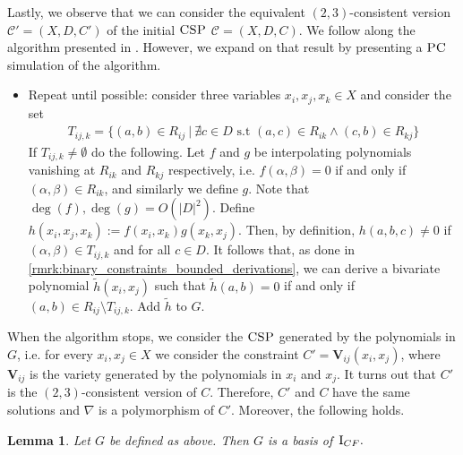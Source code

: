 \documentclass[11pt]{article}
\newcommand{\Cc}{\mathcal{C}}
\newcommand{\CSP}{\textsc{CSP}}
\newcommand{\PC}{\textsc{PC}}
\newcommand{\Variety}[1]{{\textbf{V}}\left( #1 \right)}
\newcommand{\I}{\emph{$\rm{I}$}}
\newcommand{\1}{\textbf{1}}
\newcommand{\GB}{\text{Gr\"{o}bner} }
\newtheorem{lemma}[theorem]{Lemma}
\begin{document}
Lastly, we observe that we can consider the equivalent $(2,3)$-consistent version $\Cc' = (X, D, C')$ of the initial $\CSP$ $\Cc = (X, D, C)$. We follow along the algorithm presented in \cite{BulatovRSTOC22}. However, we expand on that result by presenting a $\PC$ simulation of the algorithm.
\begin{itemize}
    \item Repeat until possible: consider three variables $x_i, x_j, x_k \in X$ and consider the set
    \begin{align*}
        T_{ij,k} = \{(a,b) \in R_{ij} \ | \ \nexists c \in D \text{ s.t } (a,c) \in R_{ik} \wedge (c,b) \in R_{kj} \} 
    \end{align*}
    If $T_{ij,k} \neq \emptyset$ do the following. Let $f$ and $g$ be interpolating polynomials vanishing at $R_{ik}$ and $R_{kj}$ respectively, i.e. $f(\alpha, \beta) = 0$ if and only if $(\alpha, \beta) \in R_{ik}$, and similarly we define $g$. Note that $\deg(f), \deg(g) = O(|D|^2)$. Define $h(x_i, x_j, x_k) := f(x_i, x_k)g(x_k, x_j)$. Then, by definition, $h(a,b,c) \neq 0$ if $(\alpha,\beta) \in T_{ij,k}$ and for all $c \in D$. It follows that, as done in \cref{rmrk:binary_constraints_bounded_derivations}, we can derive a bivariate polynomial $\tilde{h}(x_i,x_j)$ such that $\tilde{h}(a,b) = 0$ if and only if $(a,b) \in R_{ij} \setminus T_{ij,k}$. Add $\tilde{h}$ to $G$.
\end{itemize}
When the algorithm stops, we consider the $\CSP$ generated by the polynomials in $G$, i.e. for every $x_i, x_j \in X$ we consider the constraint $C' = \mathbf{V}_{ij}(x_i, x_j)$, where $\mathbf{V}_{ij}$ is the variety generated by the polynomials in $x_i$ and $x_j$. It turns out that $C'$ is the $(2,3)$-consistent version of $C$. Therefore, $C'$ and $C$ have the same solutions and $\nabla$ is a polymorphism of $C'$. Moreover, the following holds.

\begin{lemma}\cite[Lemma~4.1.5]{rafiey_constraint_2022}\label{th:complete_two-fan_grobner_basis}
    Let $G$ be defined as above. Then $G$ is a \GB basis of~$\I_{CF}.$
\end{lemma}


\end{document}
